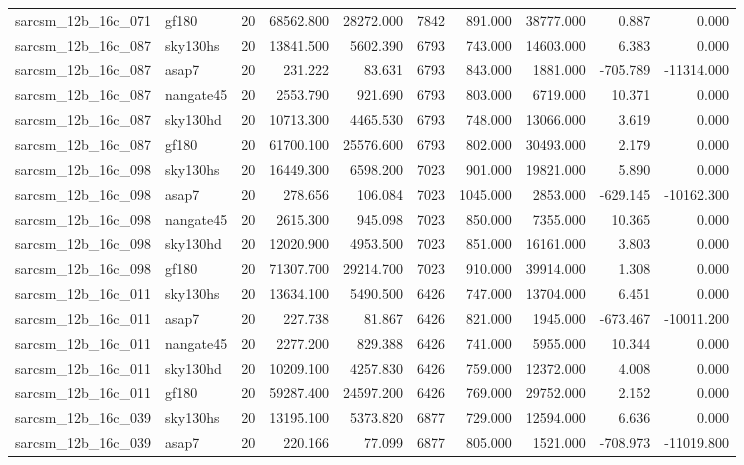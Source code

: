 \begin{tabular}{llrrrrrrrr}
sarcsm\_12b\_16c\_071 & gf180 & 20 & 68562.800 & 28272.000 & 7842 & 891.000 & 38777.000 & 0.887 & 0.000 \\
sarcsm\_12b\_16c\_087 & sky130hs & 20 & 13841.500 & 5602.390 & 6793 & 743.000 & 14603.000 & 6.383 & 0.000 \\
sarcsm\_12b\_16c\_087 & asap7 & 20 & 231.222 & 83.631 & 6793 & 843.000 & 1881.000 & -705.789 & -11314.000 \\
sarcsm\_12b\_16c\_087 & nangate45 & 20 & 2553.790 & 921.690 & 6793 & 803.000 & 6719.000 & 10.371 & 0.000 \\
sarcsm\_12b\_16c\_087 & sky130hd & 20 & 10713.300 & 4465.530 & 6793 & 748.000 & 13066.000 & 3.619 & 0.000 \\
sarcsm\_12b\_16c\_087 & gf180 & 20 & 61700.100 & 25576.600 & 6793 & 802.000 & 30493.000 & 2.179 & 0.000 \\
sarcsm\_12b\_16c\_098 & sky130hs & 20 & 16449.300 & 6598.200 & 7023 & 901.000 & 19821.000 & 5.890 & 0.000 \\
sarcsm\_12b\_16c\_098 & asap7 & 20 & 278.656 & 106.084 & 7023 & 1045.000 & 2853.000 & -629.145 & -10162.300 \\
sarcsm\_12b\_16c\_098 & nangate45 & 20 & 2615.300 & 945.098 & 7023 & 850.000 & 7355.000 & 10.365 & 0.000 \\
sarcsm\_12b\_16c\_098 & sky130hd & 20 & 12020.900 & 4953.500 & 7023 & 851.000 & 16161.000 & 3.803 & 0.000 \\
sarcsm\_12b\_16c\_098 & gf180 & 20 & 71307.700 & 29214.700 & 7023 & 910.000 & 39914.000 & 1.308 & 0.000 \\
sarcsm\_12b\_16c\_011 & sky130hs & 20 & 13634.100 & 5490.500 & 6426 & 747.000 & 13704.000 & 6.451 & 0.000 \\
sarcsm\_12b\_16c\_011 & asap7 & 20 & 227.738 & 81.867 & 6426 & 821.000 & 1945.000 & -673.467 & -10011.200 \\
sarcsm\_12b\_16c\_011 & nangate45 & 20 & 2277.200 & 829.388 & 6426 & 741.000 & 5955.000 & 10.344 & 0.000 \\
sarcsm\_12b\_16c\_011 & sky130hd & 20 & 10209.100 & 4257.830 & 6426 & 759.000 & 12372.000 & 4.008 & 0.000 \\
sarcsm\_12b\_16c\_011 & gf180 & 20 & 59287.400 & 24597.200 & 6426 & 769.000 & 29752.000 & 2.152 & 0.000 \\
sarcsm\_12b\_16c\_039 & sky130hs & 20 & 13195.100 & 5373.820 & 6877 & 729.000 & 12594.000 & 6.636 & 0.000 \\
sarcsm\_12b\_16c\_039 & asap7 & 20 & 220.166 & 77.099 & 6877 & 805.000 & 1521.000 & -708.973 & -11019.800 \\

\end{tabular}
